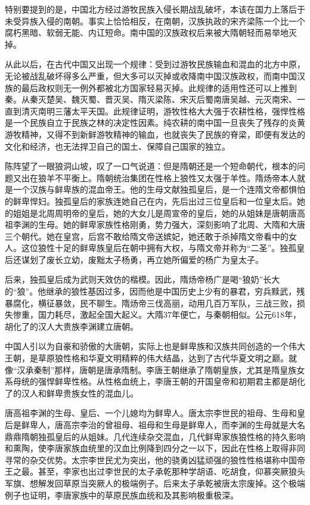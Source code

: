 \par 特别要提到的是，中国北方经过游牧民族入侵长期战乱破坏，本该在国力上落后于未受异族入侵的南朝。事实上恰恰相反，在南朝，汉族执政的宋齐梁陈一个比一个腐朽黑暗、软弱无能、内讧短命。南中国的汉族政权后来被大隋朝轻而易举地灭掉。
\par 从此以后，在古代中国又出现一个规律：受到过游牧民族输血和混血的北方中原，无论被战乱破坏得多么严重，但大多可以灭掉或收降南中国汉族政权，而南中国汉族的最后政权则无一例外都被北方国家轻易灭掉。此规律的适用性还可以上推到秦。从秦灭楚吴、魏灭蜀、晋灭吴、隋灭梁陈、宋灭后蜀南唐吴越、元灭南宋、一直到清灭南明三藩太平天国。此规律证明，游牧性格大大强于农耕性格，强悍性格是一个民族自立于民族之林的决定性因素。纯农耕的南中国一旦丧失了残存的炎黄游牧精神，又得不到新鲜游牧精神的输血，也就丧失了民族的脊梁，即便有发达的文化和经济，也无法捍卫自己的国土、保障自己国家的独立。
\par 
\par 陈阵望了一眼狼洞山坡，叹了一口气说道：但是隋朝还是一个短命朝代，根本的问题又出在狼羊不平衡上。隋朝统治集团在性格上狼性又太强于羊性。隋炀帝本人就是一个汉族与鲜卑族的混血帝王。他的生母文献独孤皇后，是一个连隋文帝都惧怕的鲜卑悍妇。独孤皇后的家族连她自己在内，先后出过三位皇后和一位皇太后。她的姐姐是北周周明帝的皇后，她的大女儿是周宣帝的皇后，她的从姐妹是唐朝唐高祖李渊的生母。她的鲜卑家族性格刚勇，势力强大，深刻影响了北周、大隋和大唐三个朝代。她在皇宫，后宫不敢给隋文帝送嫔妃，她还敢于杀掉隋文帝看中的女人。这位狼性十足的鲜卑族皇后在朝中拥有大权，与隋文帝并称为“二圣”。独孤皇后还谋划了废长立幼，废黜太子杨勇，再立她所偏爱的杨广为皇太子。
\par 后来，独孤皇后成为武则天效仿的楷模。因此，隋炀帝杨广是喝“狼奶”长大的“狼”。他继承的狼性基因过多，因而他是中国历史上少有的暴君，穷兵黩武，残暴腐化，横征暴敛，民不聊生。隋炀帝三伐高丽，动用几百万军队，三战三败，损失惨重，国力耗尽，激起全国大起义。大隋37年便亡，与秦朝相似。公元618年，胡化了的汉人大贵族李渊建立唐朝。
\par 中国人引以为自豪和骄傲的大唐朝，实际上也是鲜卑族和汉族共同创造的一个伟大王朝，是草原狼性格和华夏文明精粹的伟大结晶，达到了古代华夏文明之巅。就像“汉承秦制”那样，唐朝是唐承隋制。李唐王朝继承了隋朝皇族，尤其是隋皇族女系母统的强悍鲜卑性格。从性格血统上，李唐王朝的开国皇帝和初期君主都是胡化了的汉人和鲜卑贵族女性的混血儿。
\par 唐高祖李渊的生母、皇后、一个儿媳均为鲜卑人。唐太宗李世民的祖母、生母和皇后是鲜卑人，唐高宗李治的曾祖母、祖母和生母是鲜卑人，而李渊的生母就是大名鼎鼎隋朝独孤皇后的从姐妹。几代连续杂交混血，几代鲜卑家族狼性格的持久影响和熏陶，使李唐家族血统里的汉血比例降到四分之一以下，因此在性格上取得非同寻常的杂交优势。太宗李世民尤为突出，他的骁勇凶猛顽强的狼性性格堪称中国帝王之最。甚至，李家也出过李世民的太子承乾那种学胡语、吃胡食，仰慕突厥狼头军旗、想解发回草原当突厥人的极端例子。后来太子承乾被唐太宗废掉。这个极端例子也证明，李唐家族中的草原民族血统和及其影响极重极深。
